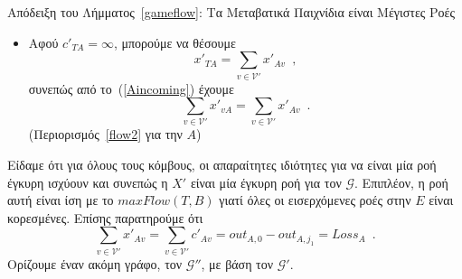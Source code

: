 \begin{sepproof}{Απόδειξη του Λήμματος~\ref{gameflow}: Τα Μεταβατικά Παιχνίδια είναι Μέγιστες Ροές}
\begin{itemize}
    Αφού $c'_{Tv} = \infty$, μπορούμε να θέσουμε
    \begin{equation*}
      x'_{Tv} = \left(out_{v, 0} - out_{v, j_1}\right) - \left(in_{v, 0} - in_{v, j_1}\right) \enspace.
    \end{equation*}
    Κατ' αυτόν τον τρόπο έχουμε
    \begin{equation*}
      \sum\limits_{w \in \mathcal{V}'}x'_{vw} = out_{v, 0} - out_{v, j_1} \mbox{ και}
    \end{equation*}
    \begin{equation*}
    \begin{gathered}
      \sum\limits_{w \in \mathcal{V}'}x'_{wv} = \sum\limits_{w \in \mathcal{V}' \setminus \{T\}}c'_{wv} + x'_{Tv} =
      in_{v, 0} - in_{v, j_1} + \\ + (out_{v, 0} - out_{v, j_1}) - (in_{v, 0} - in_{v, j_1}) = out_{v, 0} -
      out_{v, j_1} \enspace.
    \end{gathered}
    \end{equation*}
    συνεπώς
    \begin{equation*}
      \sum\limits_{w \in \mathcal{V}'}x'_{vw} = \sum\limits_{w \in \mathcal{V}'}x'_{wv} \enspace.
    \end{equation*}
    (Περιορισμός~\ref{flow2} $\forall v \in Sad_{j_1}$)
    \item Αφού $c'_{TA} = \infty$, μπορούμε να θέσουμε
    \begin{equation*}
      x'_{TA} = \sum\limits_{v \in \mathcal{V}'}x'_{Av} \enspace,
    \end{equation*}
    συνεπώς από το~(\ref{Aincoming}) έχουμε
    \begin{equation*}
      \sum\limits_{v \in \mathcal{V}'}x'_{vA} = \sum\limits_{v \in \mathcal{V}'}x'_{Av} \enspace.
    \end{equation*}
    (Περιορισμός~\ref{flow2} για την $A$)
  \end{itemize}
  Είδαμε ότι για όλους τους κόμβους, οι απαραίτητες ιδιότητες για να είναι μία ροή έγκυρη ισχύουν και συνεπώς η $X'$ είναι μία
  έγκυρη ροή για τον $\mathcal{G}$. Επιπλέον, η ροή αυτή είναι ίση με το $maxFlow\left(T, B\right)$ γιατί όλες οι εισερχόμενες
  ροές στην $E$ είναι κορεσμένες. Επίσης παρατηρούμε ότι
  \begin{equation}
  \label{xprimeequalloss}
    \sum\limits_{v \in \mathcal{V}'}x'_{Av} = \sum\limits_{v \in \mathcal{V}'}c'_{Av} = out_{A, 0} - out_{A, j_1} =
    Loss_A \enspace.
  \end{equation}
  Ορίζουμε έναν ακόμη γράφο, τον $\mathcal{G}''$, με βάση τον $\mathcal{G}'$.

\end{sepproof}
